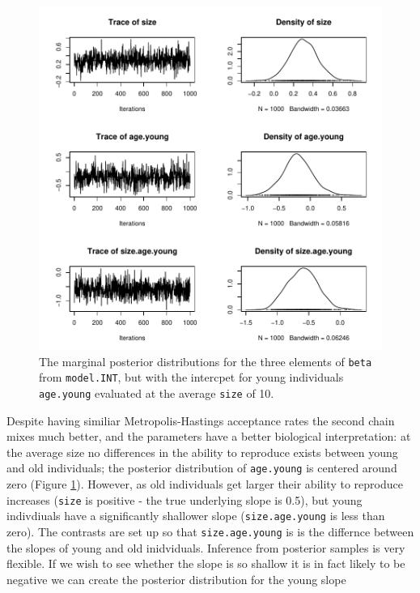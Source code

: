 \documentclass{article}
\begin{document}
\begin{figure}[!h]
\begin{center}
\includegraphics{Tutorial-060}
\end{center}
\caption{The marginal posterior distributions for the three elements of \texttt{beta} from \texttt{model.INT}, but with the intercpet for young individuals \texttt{age.young} evaluated at the average \texttt{size} of 10.  }
\label{INT.cntr-fig}
\end{figure}

Despite having similiar Metropolis-Hastings acceptance rates the second chain mixes much better, and the parameters have a better biological interpretation: at the average size no differences in the ability to reproduce exists between young and old individuals;  the posterior distribution of \texttt{age.young} is centered around zero (Figure \ref{INT.cntr-fig}).  However, as old individuals get larger their ability to reproduce increases (\texttt{size} is positive - the true underlying slope is 0.5), but young indivdiuals have a significantly shallower slope (\texttt{size.age.young} is less than zero).  The contrasts are set up so that \texttt{size.age.young} is is the differnce between the slopes of young and old inidviduals.  Inference from posterior samples is very flexible.  If we wish to see whether the slope is so shallow it is in fact likely to be negative we can create the posterior distribution for the young slope
\end{document}
